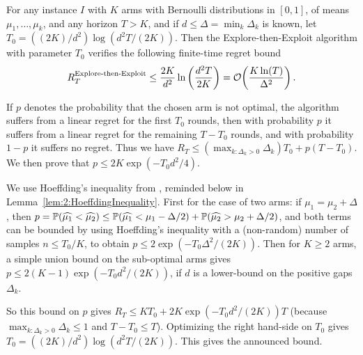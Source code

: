 \begin{theorem}\label{thm:2:ExploreThenExploit}
\begin{leftbar}[theorembar]  %
    For any instance $I$ with $K$ arms with Bernoulli distributions in $[0,1]$,
    of means $\mu_1,\dots,\mu_k$, and any horizon $T>K$,
    and if $d \leq \Delta = \min_k \Delta_k$ is known,
    let $T_0 = ((2K)/d^2) \log(d^2 T / (2K))$.
    Then the Explore-then-Exploit algorithm with parameter $T_0$ verifies the following finite-time regret bound
    \begin{equation}\label{eq:2:ExploreThenExploit}
        R_T^{\text{Explore-then-Exploit}} \leq \frac{2K}{d^2} \ln\left( \frac{d^2 T}{2K} \right) = \mathop{}\mathopen{}\mathcal{O}\mathopen{}\left(\frac{K \ln(T)}{\Delta^2}\right).
    \end{equation}
\end{leftbar}  %
\end{theorem}
%
\begin{smallproof}\label{proof:2:tuningExploreThenCommit}
    If $p$ denotes the probability that the chosen arm is not optimal,
    the algorithm suffers from a linear regret for the first $T_0$ rounds, then with probability $p$ it suffers from a linear regret for the remaining $T-T_0$ rounds, and with probability $1-p$ it suffers no regret.
    Thus we have $R_T \leq (\max_{k: \Delta_k > 0} \Delta_k) T_0 + p (T - T_0)$.
    We then prove that $p \leq 2 K \exp(-T_0 d^2 / 4)$.

    We use Hoeffding's inequality from \cite{hoeffding1963probability}, reminded below in Lemma~\ref{lem:2:HoeffdingInequality}.
    First for the case of two arms:
    if $\mu_1 = \mu_2 + \Delta$, then
    $p = \mathbb{P}(\widehat{\mu_1} < \widehat{\mu_2}) \leq \mathbb{P}(\widehat{\mu_1} < \mu_1 - \Delta/2) + \mathbb{P}(\widehat{\mu_2} > \mu_2 + \Delta/2)$, and both terms can be bounded by using Hoeffding's inequality with a (non-random) number of samples $n \leq T_0/K$,
    to obtain $p \leq 2 \exp(-T_0 \Delta^2 / (2 K))$.
    Then for $K\geq2$ arms, a simple union bound on the sub-optimal arms gives
    $p \leq 2 (K-1) \exp(-T_0 d^2 / (2 K))$, if $d$ is a lower-bound on the positive gaps $\Delta_k$.

    So this bound on $p$ gives $R_T \leq K T_0 + 2 K \exp(-T_0 d^2 / (2 K)) T$ (because $\max_{k: \Delta_k > 0} \Delta_k \leq 1$ and $T - T_0 \leq T$).
    Optimizing the right hand-side on $T_0$ gives $T_0 = ((2K)/d^2) \log(d^2 T / (2K))$.
    This gives the announced bound.
\end{smallproof}

